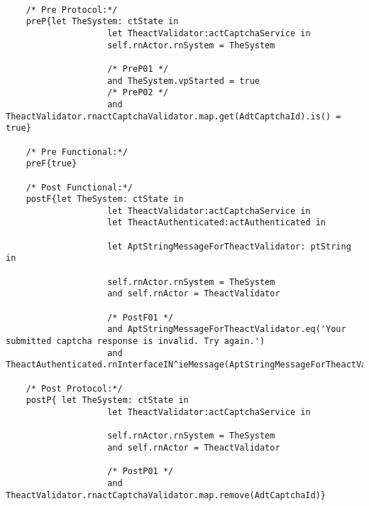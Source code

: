 	\scriptsize
	\vspace{0.5cm}
	\begin{lstlisting}[style=MessirStyle,firstnumber=auto,captionpos=b,caption={\msrmessir (MCL-oriented) specification of the operation \emph{oeCaptchaInvalid}.},label=OM-actCaptchaService-oeCaptchaInvalid-MCL-LST]

	/* Pre Protocol:*/ 
	preP{let TheSystem: ctState in
	  				let TheactValidator:actCaptchaService in
					self.rnActor.rnSystem = TheSystem
	  
					/* PreP01 */
					and TheSystem.vpStarted = true
					/* PreP02 */
					and TheactValidator.rnactCaptchaValidator.map.get(AdtCaptchaId).is() = true}
	
	/* Pre Functional:*/
	preF{true}
	
	/* Post Functional:*/ 
	postF{let TheSystem: ctState in
					let TheactValidator:actCaptchaService in
					let TheactAuthenticated:actAuthenticated in
					
					let AptStringMessageForTheactValidator: ptString in
					  
					self.rnActor.rnSystem = TheSystem
					and self.rnActor = TheactValidator
					
					/* PostF01 */
					and AptStringMessageForTheactValidator.eq('Your submitted captcha response is invalid. Try again.')
					and TheactAuthenticated.rnInterfaceIN^ieMessage(AptStringMessageForTheactValidator)}
	
	/* Post Protocol:*/ 
	postP{ let TheSystem: ctState in
				  	let TheactValidator:actCaptchaService in
				  
				  	self.rnActor.rnSystem = TheSystem
				  	and self.rnActor = TheactValidator
				  	
				  	/* PostP01 */
					and TheactValidator.rnactCaptchaValidator.map.remove(AdtCaptchaId)}
	
	\end{lstlisting}
	\normalsize 
	
	
	
	





